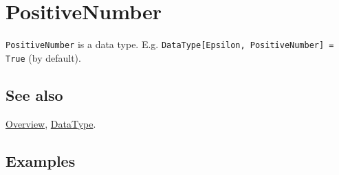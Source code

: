 \documentclass[../FeynCalcManual.tex]{subfiles}
\begin{document}
\hypertarget{positivenumber}{
\section{PositiveNumber}\label{positivenumber}}

\texttt{PositiveNumber} is a data type. E.g.
\texttt{DataType[\allowbreak{}Epsilon,\ \allowbreak{}PositiveNumber] = True}
(by default).

\subsection{See also}

\hyperlink{toc}{Overview}, \hyperlink{datatype}{DataType}.

\subsection{Examples}
\end{document}
